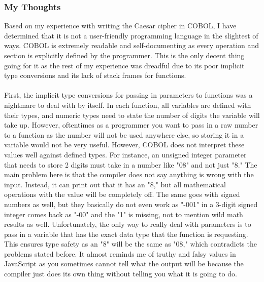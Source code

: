 \documentclass[letterpaper, 10pt, DIV=13]{scrartcl}
\numberwithin{equation}{section}
\numberwithin{figure}{section}
\numberwithin{table}{section}
\begin{document}
\subsubsection{My Thoughts}
Based on my experience with writing the Caesar cipher in COBOL, I have determined that it is not a user-friendly programming language in the slightest of ways. COBOL is extremely readable and self-documenting as every operation and section is explicitly defined by the programmer. This is the only decent thing going for it as the rest of my experience was dreadful due to its poor implicit type conversions and its lack of stack frames for functions.
\\ \\
First, the implicit type conversions for passing in parameters to functions was a nightmare to deal with by itself. In each function, all variables are defined with their types, and numeric types need to state the number of digits the variable will take up. However, oftentimes as a programmer you want to pass in a raw number to a function as the number will not be used anywhere else, so storing it in a variable would not be very useful. However, COBOL does not interpret these values well against defined types. For instance, an unsigned integer parameter that needs to store 2 digits must take in a number like "08" and not just "8." The main problem here is that the compiler does not say anything is wrong with the input. Instead, it can print out that it has an "8," but all mathematical operations with the value will be completely off. The same goes with signed numbers as well, but they basically do not even work as "-001" in a 3-digit signed integer comes back as "-00" and the "1" is missing, not to mention wild math results as well. Unfortunately, the only way to really deal with parameters is to pass in a variable that has the exact data type that the function is requesting. This ensures type safety as an "8" will be the same as "08," which contradicts the problems stated before. It almost reminds me of truthy and falsy values in JavaScript as you sometimes cannot tell what the output will be because the compiler just does its own thing without telling you what it is going to do.
\\ \\
\end{document}
